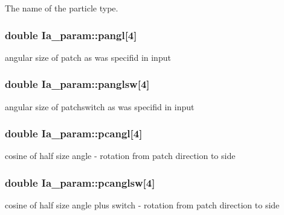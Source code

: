 The name of the particle type. 

\hypertarget{class_ia__param_a8b6be7ac5589120595dbbecb0573b4a4}{
\subsubsection[{pangl}]{\setlength{\rightskip}{0pt plus 5cm}double Ia\+\_\+param\+::pangl\mbox{[}4\mbox{]}}}\label{class_ia__param_a8b6be7ac5589120595dbbecb0573b4a4}


angular size of patch as was specifid in input 

\hypertarget{class_ia__param_a4135a2a675b1087915a103c9a528c307}{
\subsubsection[{panglsw}]{\setlength{\rightskip}{0pt plus 5cm}double Ia\+\_\+param\+::panglsw\mbox{[}4\mbox{]}}}\label{class_ia__param_a4135a2a675b1087915a103c9a528c307}


angular size of patchswitch as was specifid in input 

\hypertarget{class_ia__param_a9b41eeb7c326fd32a095499d42a134fb}{
\subsubsection[{pcangl}]{\setlength{\rightskip}{0pt plus 5cm}double Ia\+\_\+param\+::pcangl\mbox{[}4\mbox{]}}}\label{class_ia__param_a9b41eeb7c326fd32a095499d42a134fb}


cosine of half size angle -\/ rotation from patch direction to side 

\hypertarget{class_ia__param_ab0fef38181fd2df68e838ba1abc0e0ef}{
\subsubsection[{pcanglsw}]{\setlength{\rightskip}{0pt plus 5cm}double Ia\+\_\+param\+::pcanglsw\mbox{[}4\mbox{]}}}\label{class_ia__param_ab0fef38181fd2df68e838ba1abc0e0ef}


cosine of half size angle plus switch -\/ rotation from patch direction to side 

